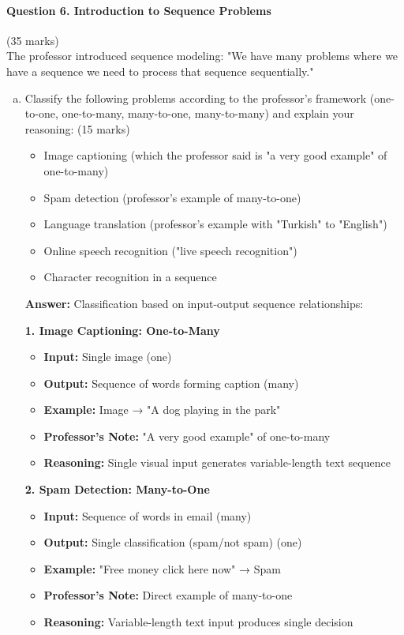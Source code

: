 \documentclass[12pt]{article}
\newcommand{\answer}[1]{{\color{answercolor}\textbf{Answer:} #1}}
\newcommand{\explanation}[1]{{\color{explanationcolor}#1}}
\begin{document}
\newpage
\paragraph{Question 6. Introduction to Sequence Problems}{\hfill (35 marks)}\\
The professor introduced sequence modeling: "We have many problems where we have a sequence we need to process that sequence sequentially."

\begin{enumerate}[(a)]
    \item Classify the following problems according to the professor's framework (one-to-one, one-to-many, many-to-one, many-to-many) and explain your reasoning: \hfill (15 marks)
    \begin{itemize}
        \item Image captioning (which the professor said is "a very good example" of one-to-many)
        \item Spam detection (professor's example of many-to-one)
        \item Language translation (professor's example with "Turkish" to "English")
        \item Online speech recognition ("live speech recognition")
        \item Character recognition in a sequence
    \end{itemize}
    
    \answer{Classification based on input-output sequence relationships:}
    
    \explanation{
    \textbf{1. Image Captioning: One-to-Many}
    \begin{itemize}
        \item \textbf{Input:} Single image (one)
        \item \textbf{Output:} Sequence of words forming caption (many)
        \item \textbf{Example:} Image → "A dog playing in the park"
        \item \textbf{Professor's Note:} "A very good example" of one-to-many
        \item \textbf{Reasoning:} Single visual input generates variable-length text sequence
    \end{itemize}
    
    \textbf{2. Spam Detection: Many-to-One}
    \begin{itemize}
        \item \textbf{Input:} Sequence of words in email (many)
        \item \textbf{Output:} Single classification (spam/not spam) (one)
        \item \textbf{Example:} "Free money click here now" → Spam
        \item \textbf{Professor's Note:} Direct example of many-to-one
        \item \textbf{Reasoning:} Variable-length text input produces single decision
    \end{itemize}
    
}
\end{enumerate}
\end{document}
